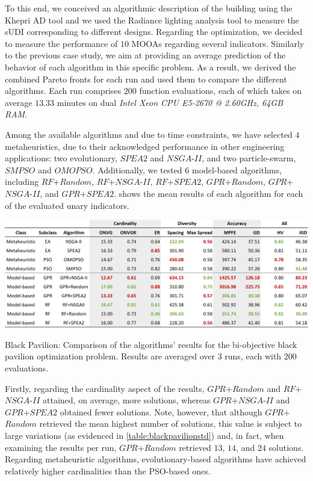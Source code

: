 To this end, we conceived an algorithmic description of the building using the Khepri \ac{AD} tool and we used the Radiance lighting analysis tool to measure the \ac{sUDI} corresponding to different designs. Regarding the optimization, we decided to measure the performance of $10$ \acp{MOOA} regarding several indicators. Similarly to the previous case study, we aim at providing an average prediction of the behavior of each algorithm in this specific problem. As a result, we derived the combined Pareto fronts for each run and used them to compare the different algorithms. Each run comprises $200$ function evaluations, each of which takes on average $13.33$ minutes on dual \textit{Intel Xeon CPU E5-2670 @ 2.60GHz, 64GB RAM}.

Among the available algorithms and due to time constraints, we have selected $4$ metaheuristics, due to their acknowledged performance in other engineering applications: two evolutionary, $SPEA2$ and $NSGA$-$II$, and two particle-swarm, $SMPSO$ and $OMOPSO$. Additionally, we tested $6$ model-based algorithms, including $RF$+$Random$, $RF$+$NSGA$-$II$, $RF$+$SPEA2$, $GPR$+$Random$, $GPR$+$NSGA$-$II$, and $GPR$+$SPEA2$.  shows the mean results of each algorithm for each of the evaluated unary indicators. 

\begin{table}[htbp]
	\centering
	\includegraphics[width=\textwidth]{Images/Evaluation/BlackPavilion/Results_Mean_20190416.PNG}
	\caption[Black Pavilion: Mean performance values of the algorithms' results]{Black Pavilion: Comparison of the algorithms' results for the bi-objective black pavilion optimization problem. Results are averaged over $3$ runs, each with $200$ evaluations.}
	\label{table:blackpavilion}
\end{table}

Firstly, regarding the cardinality aspect of the results, $GPR$+$Random$ and $RF$+$NSGA$-$II$ attained, on average, more solutions, whereas $GPR$+$NSGA$-$II$ and $GPR$+$SPEA2$ obtained fewer solutions. Note, however, that although $GPR$+$Random$ retrieved the mean highest number of solutions, this value is subject to large variations (as evidenced in \cref{table:blackpavilionstd}) and, in fact, when examining the results per run, $GPR$+$Random$ retrieved $13$, $14$, and $24$ solutions. Regarding metaheuristic algorithms, evolutionary-based algorithms have achieved relatively higher cardinalities than the \ac{PSO}-based ones. 

